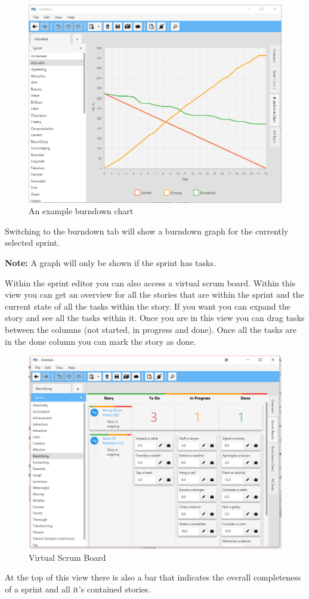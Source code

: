\begin{figure}[H]
\centering
\includegraphics[width=\textwidth]{images/screenshots/burndown.png}
\caption{An example burndown chart}
\label{fig:burndown}
\end{figure}

Switching to the burndown tab will show a burndown graph for the currently selected sprint.

\textbf{Note:}\newline
A graph will only be shown if the sprint has tasks.

Within the sprint editor you can also access a virtual scrum board. Within this view you can get an overview for all the stories that are within the sprint and the current state of all the tasks within the story. If you want you can expand the story and see all the tasks within it. Once you are in this view you can drag tasks between the columns (not started, in progress and done). Once all the tasks are in the done column you can mark the story as done.

\begin{figure}[H]
\centering
\includegraphics[width=\textwidth]{images/screenshots/scrumboard.png}
\caption{Virtual Scrum Board}
\label{fig:srumboard}
\end{figure}

At the top of this view there is also a bar that indicates the overall completeness of a sprint and all it's contained stories.